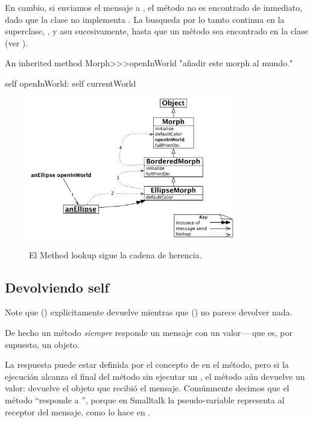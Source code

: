 \documentclass[a4paper,10pt,twoside]{book}
\begin{document}
En cambio, si enviamos el mensaje  a , el m\'etodo no es encontrado de inmediato, dado que la clase  no implementa .
La busqueda por lo tamto continua en la superclase, , y asu sucesivamente, hasta que un m\'etodo  sea encontrado en la clase  (ver ).

\begin{method}[openInWorld]{An inherited method}
Morph>>>openInWorld
	"a\~nadir este morph al mundo."

	self openInWorld: self currentWorld
\end{method}

\begin{figure}[htb]
\begin{center}
	{\includegraphics[width=0.8\textwidth]{openInWorldLookup}}
\caption{El Method lookup sigue la cadena de herencia.}
\end{center}
\end{figure}

\subsection{Devolviendo self}

Note que  () explicitamente devuelve  mientras que  () no parece devolver nada.

De hecho un m\'etodo \emph{siempre} responde un mensaje con un valor\,---\,que es, por supuesto, un objeto.

La respuesta puede estar definida por el concepto de \ct{^} en el m\'etodo, pero si la ejecuci\'on alcanza el final del m\'etodo sin ejecutar un \ct{^}, el m\'etodo a\'un devuelve un valor: devuelve el objeto que recibi\'o el mensaje.
Com\'unmente decimos que el m\'etodo ``responde a \self'', porque en Smalltalk la pseudo-variable \self representa al receptor del mensaje, como lo hace  en .
\end{document}
